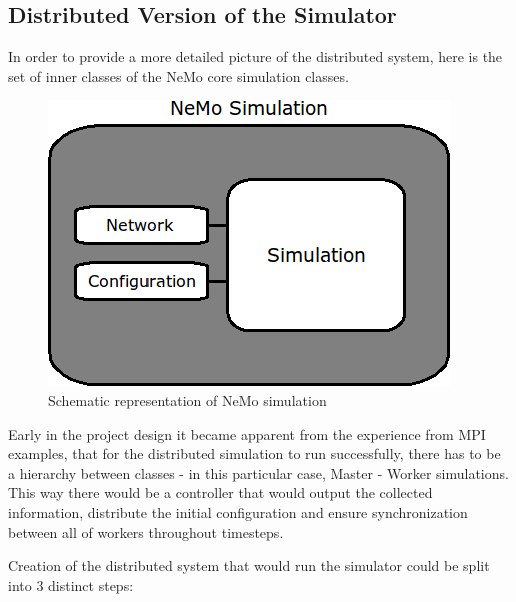 \subsection{Distributed Version of the Simulator}

In order to provide a more detailed picture of the distributed system, here is the set of inner classes of the NeMo core simulation classes.

\begin{figure}[h!]
\begin{center}
\includegraphics[scale = 0.6]{images/design/nemo_simulation_schematic.png}
\end{center}
\caption{Schematic representation of NeMo simulation}
\end{figure}

Early in the project design it became apparent from the experience from MPI examples\cite{}, that for the distributed simulation to run successfully, there has to be a hierarchy between classes - in this particular case, Master - Worker simulations. This way there would be a controller that would output the collected information, distribute the initial configuration and ensure synchronization between all of workers throughout timesteps.

Creation of the distributed system that would run the simulator could be split into 3 distinct steps:

